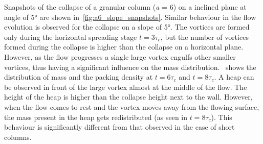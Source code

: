 Snapshots of the collapse of a granular column (\textit{a} = 6) on a inclined 
plane at angle of 5\si{\degree} are shown in~\cref{fig:a6_slope_snapshots}. 
Similar behaviour in the flow evolution is observed for the collapse on a slope 
of 5\si{\degree}. The vortices are formed only during the horizontal spreading 
stage $t = 3\tau_c$, but the number of vortices formed during the collapse is 
higher than the collapse on a horizontal plane. However, as the flow progresses 
a single large vortex engulfs other smaller vortices, thus having a 
significant influence on the mass distribution.~ shows 
the distribution of mass and the packing density at $t = 6\tau_c$ and $t = 
8\tau_c$. A heap can be observed in front of the large vortex almost at the 
middle of the flow. The height of the heap is higher than the collapse height 
next to the wall. However, when the flow comes to rest and the vortex moves 
away from the flowing surface, the mass present in the heap gets redistributed 
(as seen in $t = 8\tau_c$). This behaviour is significantly different from that 
observed in the case of short columns. 

